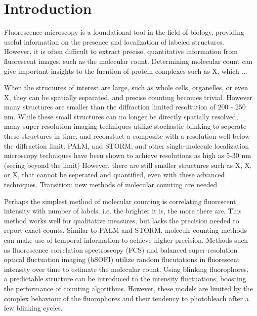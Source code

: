 \section{Introduction}



Fluorescence microscopy is a foundational tool in the field of biology,
  providing useful information on the presence and localization 
  of labeled structures.
%
  However, it is often difficult to extract precise, quantitative information
  from fluorescent images, such as the molecular count.
  Determining molecular count can give important insights to the fucntion
  of protein complexes such as X, which ...

When the structures of interest are large, such as whole cells, organelles,
  or even X, they can be spatially separated, and precise counting becomes trivial.
  However many structures are smaller than the diffraction limited resoltution of 200 - 250 nm.
%
While these small structures can no longer be directly spatially resolved, many super-resolution 
  imaging techniques utilize stochastic blinking to seperate these structures in time,
  and reconstuct a composite with a resolution well below the diffraction limit. 
  PALM, and STORM, and other single-molecule localization microscopy techniques
  have been shown to achieve resolutions as high as 5-30 nm (seeing beyond the limit)
  However, there are still smaller structures such as X, X, or X, that 
  cannot be seperated and quantified, even with these advanced techniques. 
  Transition: new methods of molecular counting are needed

Perhaps the simplest method of molecular counting is correlating fluorescent
    intensity with number of labels. i.e. the brighter it is, the more there are. 
    This method works well for qualitative measures, but lacks the precision needed 
    to report exact counts. 
    Similar to PALM and STORM, moleculr counting methods can make use of temporal information
    to achieve higher precision.
    Methods such as fluorescence correlation spectroscopy (FCS) and 
    balanced super-resolution optical fluctuation imaging (bSOFI)
    utilize random flucutations in fluorescent intensity over time to estimate the molecular count.
    Using blinking fluorophores, a predictable structure can be introduced 
    to the intensity fluctuations, boosting the performance of counting algorithms.
    However, these models are limited by the complex behaviour of the fluorophores and their
    tendency to photobleach after a few blinking cycles.


